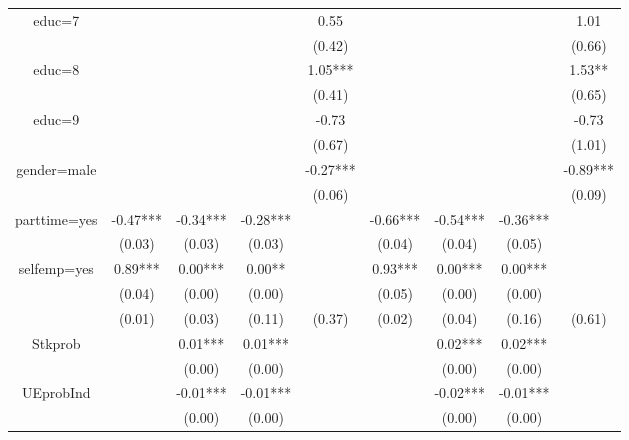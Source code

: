 \documentclass[12pt,notitlepage,onecolumn,aps,pra]{article}
\begin{document}
\begin{table}[ht]
\begin{adjustbox}{width={0.9\textwidth},totalheight={\textheight}}
\begin{threeparttable}
\begin{tabular}{ccccccccc}
educ=7       &           &           &            &        0.55 &           &            &             &         1.01 \\
             &           &           &            &      (0.42) &           &            &             &       (0.66) \\
educ=8       &           &           &            &     1.05*** &           &            &             &       1.53** \\
             &           &           &            &      (0.41) &           &            &             &       (0.65) \\
educ=9       &           &           &            &       -0.73 &           &            &             &        -0.73 \\
             &           &           &            &      (0.67) &           &            &             &       (1.01) \\
gender=male  &           &           &            &    -0.27*** &           &            &             &     -0.89*** \\
             &           &           &            &      (0.06) &           &            &             &       (0.09) \\
parttime=yes &  -0.47*** &  -0.34*** &   -0.28*** &             &  -0.66*** &   -0.54*** &    -0.36*** &              \\
             &    (0.03) &    (0.03) &     (0.03) &             &    (0.04) &     (0.04) &      (0.05) &              \\
selfemp=yes  &   0.89*** &   0.00*** &     0.00** &             &   0.93*** &    0.00*** &     0.00*** &              \\
             &    (0.04) &    (0.00) &     (0.00) &             &    (0.05) &     (0.00) &      (0.00) &              \\
             &    (0.01) &    (0.03) &     (0.11) &      (0.37) &    (0.02) &     (0.04) &      (0.16) &       (0.61) \\
Stkprob      &           &   0.01*** &    0.01*** &             &           &    0.02*** &     0.02*** &              \\
             &           &    (0.00) &     (0.00) &             &           &     (0.00) &      (0.00) &              \\
UEprobInd    &           &  -0.01*** &   -0.01*** &             &           &   -0.02*** &    -0.01*** &              \\
             &           &    (0.00) &     (0.00) &             &           &     (0.00) &      (0.00) &              \\

\end{tabular}
\end{threeparttable}
\end{adjustbox}
\end{table}
\end{document}
